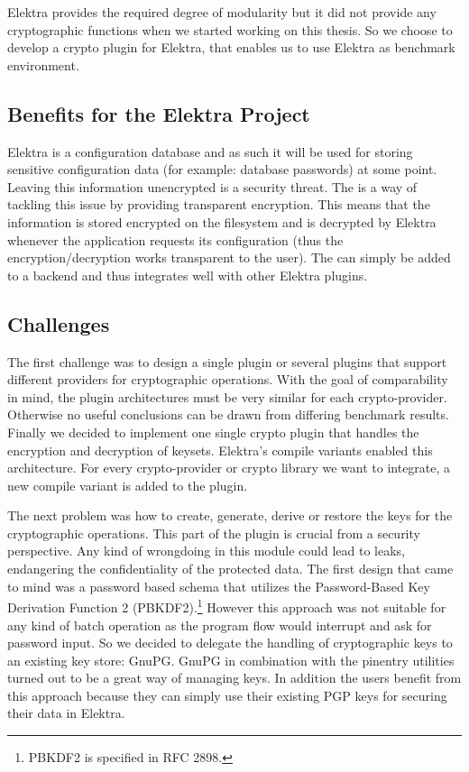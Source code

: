 Elektra provides the required degree of modularity but it did not provide any cryptographic functions when we started working on this thesis.
So we choose to develop a crypto plugin for Elektra, that enables us to use Elektra as benchmark environment.

\subsection{Benefits for the Elektra Project}

Elektra is a configuration database and as such it will be used for storing sensitive configuration data (for example: database passwords) at some point.
Leaving this information unencrypted is a security threat.
The \crypto{} is a way of tackling this issue by providing transparent encryption.
This means that the information is stored encrypted on the filesystem and is decrypted by Elektra whenever the application requests its configuration (thus the encryption/decryption works transparent to the user). The \crypto{} can simply be added to a backend and thus integrates well with other Elektra plugins.

\subsection{Challenges}

The first challenge was to design a single plugin or several plugins that support different providers for cryptographic operations.
With the goal of comparability in mind, the plugin architectures must be very similar for each crypto-provider.
Otherwise no useful conclusions can be drawn from differing benchmark results.
Finally we decided to implement one single crypto plugin that handles the encryption and decryption of keysets.
Elektra's compile variants enabled this architecture.
For every crypto-provider or crypto library we want to integrate, a new compile variant is added to the plugin.

The next problem was how to create, generate, derive or restore the keys for the cryptographic operations.
This part of the plugin is crucial from a security perspective.
Any kind of wrongdoing in this module could lead to leaks, endangering the confidentiality of the protected data.
The first design that came to mind was a password based schema that utilizes the Password-Based Key Derivation Function 2 (PBKDF2).\footnote{PBKDF2 is specified in RFC 2898.}
However this approach was not suitable for any kind of batch operation as the program flow would interrupt and ask for password input.
So we decided to delegate the handling of cryptographic keys to an existing key store: GnuPG.
GnuPG in combination with the pinentry utilities turned out to be a great way of managing keys.
In addition the users benefit from this approach because they can simply use their existing PGP keys for securing their data in Elektra.


